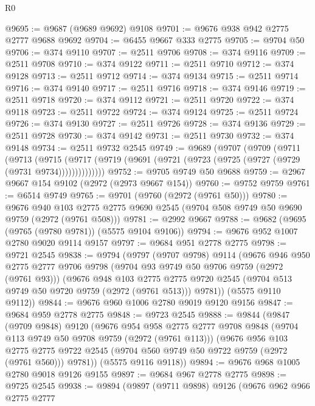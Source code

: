 \begin{lexlean}{R0}
\begin{coremodule}
@9695 := @9687 (@9689 @9692) @9108
@9701 := @9676 @938 @942 @2775 @2777 @9688 @9692
@9704 := @6455 @9667 @333 @2775
@9705 := @9704 @50
@9706 := @374 @9110
@9707 := @2511 @9706
@9708 := @374 @9116
@9709 := @2511 @9708
@9710 := @374 @9122
@9711 := @2511 @9710
@9712 := @374 @9128
@9713 := @2511 @9712
@9714 := @374 @9134
@9715 := @2511 @9714
@9716 := @374 @9140
@9717 := @2511 @9716
@9718 := @374 @9146
@9719 := @2511 @9718
@9720 := @374 @9112
@9721 := @2511 @9720
@9722 := @374 @9118
@9723 := @2511 @9722
@9724 := @374 @9124
@9725 := @2511 @9724
@9726 := @374 @9130
@9727 := @2511 @9726
@9728 := @374 @9136
@9729 := @2511 @9728
@9730 := @374 @9142
@9731 := @2511 @9730
@9732 := @374 @9148
@9734 := @2511 @9732 @2545
@9749 := @9689
    (@9707
      (@9709
        (@9711
          (@9713
            (@9715
              (@9717 (@9719 (@9691 (@9721 (@9723 (@9725 (@9727 (@9729 (@9731 @9734))))))))))))))
@9752 := @9705 @9749 @50 @9688
@9759 := @2967 @9667 @154 @9102 (@2972 (@2973 @9667 @154))
@9760 := @9752 @9759
@9761 := @6514 @9749
@9765 := @9701 (@9760 (@2972 (@9761 @50)))
@9780 := @9676
    @940
    @103
    @2775
    @2775
    @9690
    @2545
    (@9704 @508 @9749 @50 @9690 @9759 (@2972 (@9761 @508)))
@9781 := @2992 @9667
@9788 := @9682 (@9695 (@9765 (@9780 @9781)) (@5575 @9104 @9106))
@9794 := @9676 @952 @1007 @2780 @9020 @9114 @9157
@9797 := @9684 @951 @2778 @2775
@9798 := @9721 @2545
@9838 := @9794
    (@9797
      (@9707 @9798)
      @9114
      (@9676
        @946
        @950
        @2775
        @2777
        @9706
        @9798
        (@9704 @93 @9749 @50 @9706 @9759 (@2972 (@9761 @93)))
        (@9676
          @948
          @103
          @2775
          @2775
          @9720
          @2545
          (@9704 @513 @9749 @50 @9720 @9759 (@2972 (@9761 @513)))
          @9781))
      (@5575 @9110 @9112))
@9844 := @9676 @960 @1006 @2780 @9019 @9120 @9156
@9847 := @9684 @959 @2778 @2775
@9848 := @9723 @2545
@9888 := @9844
    (@9847
      (@9709 @9848)
      @9120
      (@9676
        @954
        @958
        @2775
        @2777
        @9708
        @9848
        (@9704 @113 @9749 @50 @9708 @9759 (@2972 (@9761 @113)))
        (@9676
          @956
          @103
          @2775
          @2775
          @9722
          @2545
          (@9704 @560 @9749 @50 @9722 @9759 (@2972 (@9761 @560)))
          @9781))
      (@5575 @9116 @9118))
@9894 := @9676 @968 @1005 @2780 @9018 @9126 @9155
@9897 := @9684 @967 @2778 @2775
@9898 := @9725 @2545
@9938 := @9894
    (@9897
      (@9711 @9898)
      @9126
      (@9676
        @962
        @966
        @2775
        @2777

\end{coremodule}
\end{lexlean}
